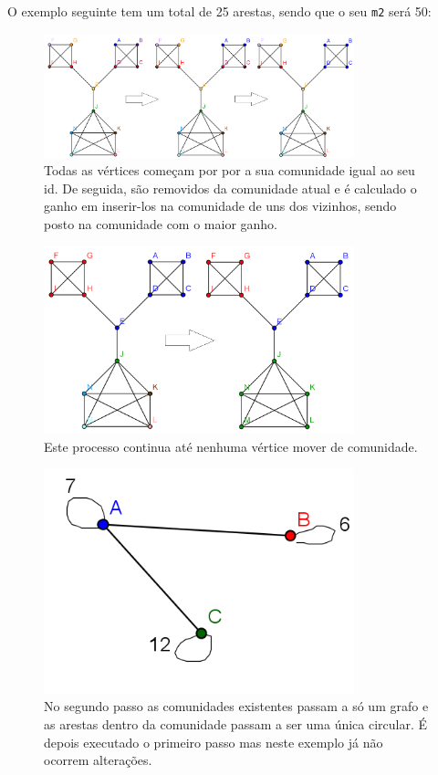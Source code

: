 \documentclass[a4paper,10pt]{report}
\begin{document}
O exemplo seguinte tem um total de 25 arestas, sendo que o seu \verb|m2| será 50:
\begin{figure}
\includegraphics[width=90mm]{graphf1}
\caption{Todas as vértices começam por por a sua comunidade igual ao seu id. De seguida, são removidos da comunidade atual e é calculado o ganho em inserir-los na comunidade de uns dos vizinhos, sendo posto na comunidade com o maior ganho.}
\end{figure}
\begin{figure}
\includegraphics[width=90mm]{graphf2}
\caption{Este processo continua até nenhuma vértice mover de comunidade.}
\end{figure}
\begin{figure}
\includegraphics[width=90mm]{graphf3}
\caption{No segundo passo as comunidades existentes passam a só um grafo e as arestas dentro da comunidade passam a ser uma única circular. É depois executado o primeiro passo mas neste exemplo já não ocorrem alterações.}
\end{figure}
\end{document}
